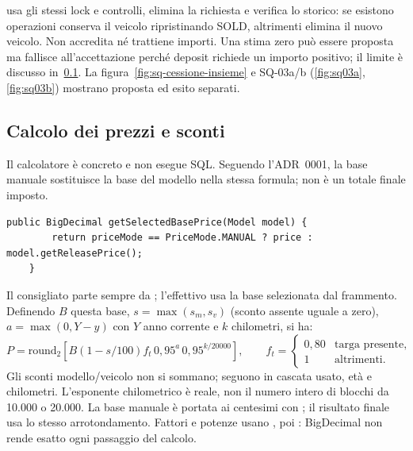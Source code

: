  usa gli stessi lock e controlli, elimina la
richiesta e verifica lo storico: se esistono operazioni conserva il
veicolo ripristinando SOLD, altrimenti elimina il nuovo veicolo. Non
accredita né trattiene importi. Una stima zero può essere proposta ma
fallisce all'accettazione perché deposit richiede un importo positivo;
il limite è discusso in~\ref{sec:impl-prezzi}. La
figura~\ref{fig:sq-cessione-insieme} e SQ-03a/b
(\ref{fig:sq03a}, \ref{fig:sq03b}) mostrano proposta ed esito separati.

\subsection{Calcolo dei prezzi e sconti}\label{sec:impl-prezzi}
Il calcolatore  è concreto e non esegue SQL.
Seguendo l'ADR~0001, la base manuale sostituisce la base del modello
nella stessa formula; non è un totale finale imposto.

\noindent\begin{minipage}{\linewidth}
\begin{lstlisting}[firstnumber=122,caption={\code{Vehicle.java}: selezione della base, prima della formula.},
  label=lst:base]
    public BigDecimal getSelectedBasePrice(Model model) {
        return priceMode == PriceMode.MANUAL ? price : model.getReleasePrice();
    }
\end{lstlisting}
\end{minipage}

Il consigliato parte sempre da ; l'effettivo
usa la base selezionata dal frammento. Definendo $B$ questa base,
$s=\max(s_m,s_v)$ (sconto assente uguale a zero), $a=\max(0,Y-y)$
con $Y$ anno corrente e $k$ chilometri, si ha:
\[
 P=\mathrm{round}_{2}\!\left[
 B(1-s/100)f_t\,0{,}95^{a}\,0{,}95^{k/20000}\right],
 \qquad f_t=\left\{\begin{array}{ll}0{,}80&\mbox{targa presente},\\1&\mbox{altrimenti}.\end{array}\right.
\]
Gli sconti modello/veicolo non si sommano; seguono in cascata usato, età
e chilometri. L'esponente chilometrico è reale, non il numero intero di
blocchi da 10.000 o 20.000. La base manuale è portata ai centesimi con
; il risultato finale usa lo stesso arrotondamento.
Fattori e potenze usano , poi :
BigDecimal non rende esatto ogni passaggio del calcolo.

